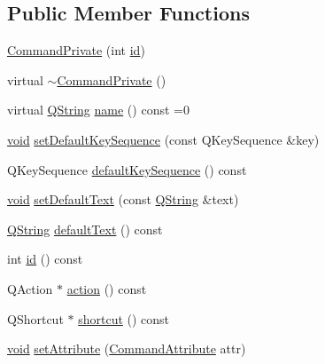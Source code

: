 \subsection*{\-Public \-Member \-Functions}
\begin{DoxyCompactItemize}
\item 
\hyperlink{group___core_plugin_ga1c5b2228ffc54eaf4ce625d77f65cdc5}{\-Command\-Private} (int \hyperlink{group___core_plugin_gac039f1f888e5c7bd1a5d46458aeb1610}{id})
\item 
virtual \hyperlink{group___core_plugin_gabc88fac03e222720af857aced98c4a47}{$\sim$\-Command\-Private} ()
\item 
virtual \hyperlink{group___u_a_v_objects_plugin_gab9d252f49c333c94a72f97ce3105a32d}{\-Q\-String} \hyperlink{group___core_plugin_ga8e81a766f4f007fecaff02141fce57b0}{name} () const =0
\item 
\hyperlink{group___u_a_v_objects_plugin_ga444cf2ff3f0ecbe028adce838d373f5c}{void} \hyperlink{group___core_plugin_gac9f1ccd687f475929f102d8776232b3b}{set\-Default\-Key\-Sequence} (const \-Q\-Key\-Sequence \&key)
\item 
\-Q\-Key\-Sequence \hyperlink{group___core_plugin_ga51907026664cc58e42489c339b9eb46a}{default\-Key\-Sequence} () const 
\item 
\hyperlink{group___u_a_v_objects_plugin_ga444cf2ff3f0ecbe028adce838d373f5c}{void} \hyperlink{group___core_plugin_ga2d41122d5a7355bf8f7e7a0b67aa2d80}{set\-Default\-Text} (const \hyperlink{group___u_a_v_objects_plugin_gab9d252f49c333c94a72f97ce3105a32d}{\-Q\-String} \&text)
\item 
\hyperlink{group___u_a_v_objects_plugin_gab9d252f49c333c94a72f97ce3105a32d}{\-Q\-String} \hyperlink{group___core_plugin_ga2b2e1c3987c86e2e1f26954ccb3fdc3f}{default\-Text} () const 
\item 
int \hyperlink{group___core_plugin_gac039f1f888e5c7bd1a5d46458aeb1610}{id} () const 
\item 
\-Q\-Action $\ast$ \hyperlink{group___core_plugin_gad734a314cde2a62a35d6e430ddbea197}{action} () const 
\item 
\-Q\-Shortcut $\ast$ \hyperlink{group___core_plugin_ga84659db83eaa89893189a8bb76e5aa64}{shortcut} () const 
\item 
\hyperlink{group___u_a_v_objects_plugin_ga444cf2ff3f0ecbe028adce838d373f5c}{void} \hyperlink{group___core_plugin_ga5639adbdd06c41c271817051fa4f46cc}{set\-Attribute} (\hyperlink{group___core_plugin_ga4d899c1f711159a432afeab3eb78c917}{\-Command\-Attribute} attr)
\item 

\end{DoxyCompactItemize}
